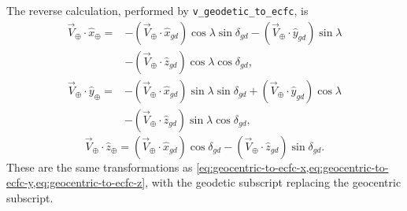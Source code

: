 The reverse calculation, performed by \texttt{v\_geodetic\_to\_ecfc}, is
\begin{equation}
\begin{aligned}
  \vec{V}_{\oplus}\cdot\hat{x}_{\oplus}
    ={}&-(\vec{V}_{\oplus}\cdot\hat{x}_{gd})
         \cos\lambda\sin\delta_{gd}
       -(\vec{V}_{\oplus}\cdot\hat{y}_{gd})\sin\lambda\\
      &-(\vec{V}_{\oplus}\cdot\hat{z}_{gd})
         \cos\lambda\cos\delta_{gd},
\end{aligned}
\label{eq:geodetic-to-ecfc-x}
\end{equation}
\begin{equation}
\begin{aligned}
  \vec{V}_{\oplus}\cdot\hat{y}_{\oplus}
    ={}&-(\vec{V}_{\oplus}\cdot\hat{x}_{gd})
         \sin\lambda\sin\delta_{gd}
       +(\vec{V}_{\oplus}\cdot\hat{y}_{gd})\cos\lambda\\
      &-(\vec{V}_{\oplus}\cdot\hat{z}_{gd})
         \sin\lambda\cos\delta_{gd},
\end{aligned}
\label{eq:geodetic-to-ecfc-y}
\end{equation}
\begin{equation}
  \vec{V}_{\oplus}\cdot\hat{z}_{\oplus}
    =(\vec{V}_{\oplus}\cdot\hat{x}_{gd})\cos\delta_{gd}
     -(\vec{V}_{\oplus}\cdot\hat{z}_{gd})\sin\delta_{gd}.
  \label{eq:geodetic-to-ecfc-z}
\end{equation}
These are the same transformations as
\cref{eq:geocentric-to-ecfc-x,eq:geocentric-to-ecfc-y,eq:geocentric-to-ecfc-z},
with the geodetic subscript replacing the geocentric subscript.
